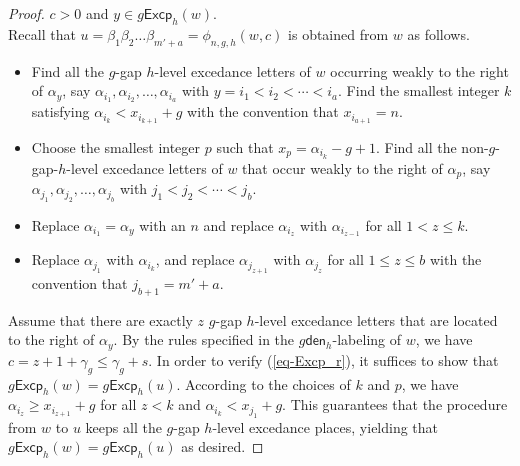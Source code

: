 \documentclass[12pt]{article}
\numberwithin{equation}{section}
\theoremstyle{plain}
\def\den{\mathsf{den}}
\def\Excp{\mathsf{Excp}}
\begin{document}
\begin{proof}
   
  $c>0$ and $y\in g\Excp_h(w)$.\\
Recall that   $u=\beta_1\beta_2\ldots\beta_{m'+a}=\phi_{n,g,h}(w,c)$ is obtained  from $w$ as follows.
	\begin{itemize}
	\item  Find all the $g$-gap $h$-level excedance letters   of $w$  occurring      weakly to the right of   $\alpha_y$,  say
	$\alpha_{i_1}, \alpha_{i_2}, \ldots, \alpha_{i_a}$ with
	$ y=i_1<i_2<\cdots <i_a$. Find the smallest  integer $k$ satisfying $\alpha_{i_k}< x_{i_{k+1}}+g$   with the convention that $x_{i_{a+1}}=n$.
	\item    
	Choose the smallest integer  $p$ such that $x_p=\alpha_{i_k}-g+1$.	Find all the  non-$g$-gap-$h$-level excedance letters of $w$ that occur   weakly   to  the right  of $\alpha_{p}$, say $\alpha_{j_1}, \alpha_{j_2}, \ldots, \alpha_{j_b}$ with $ j_1<j_2<\cdots<j_b$.    
	\item   Replace  $\alpha_{i_1}=\alpha_y$ with an  $n$ and replace   $\alpha_{i_{z}}$  with $\alpha_{i_{z-1}}$  for all $1< z\leq k$. 
	
	\item  Replace  $\alpha_{j_1}$ with $\alpha_{i_k}$,  and  replace  $\alpha_{j_{z+1}}$ with $\alpha_{j_{z}}$ for all $1\leq z\leq b $  with the convention that $j_{b+1}=m'+a$.   
\end{itemize}

 Assume that there are exactly  $z$ $g$-gap  $h$-level excedance letters that are located to the right of $\alpha_y$. 
By the rules specified in the $g\den_h$-labeling of $w$, we have $c=z+1+\gamma_g\leq \gamma_g+s$.  In order to verify (\ref{eq-Excp_r}), it suffices to show that  $g\Excp_h(w)=g\Excp_h(u)$. 
According to the choices   of $k$ and $p$, we have $\alpha_{i_z}\geq  x_{i_{z+1}}+g$ for all $z<k$ and $\alpha_{i_k}< x_{j_1}+g$. This guarantees  that   the procedure from $w$ to $u$ keeps  all  the $g$-gap $h$-level excedance places, yielding that $g\Excp_h(w)=g\Excp_h(u)$ as desired.    
 


\end{proof}
\end{document}
